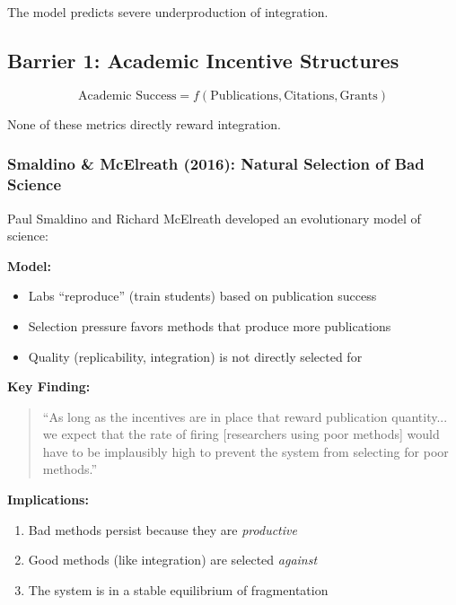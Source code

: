 \documentclass[12pt,a4paper]{article}
\begin{document}
The model predicts severe underproduction of integration.

\subsection{Barrier 1: Academic Incentive Structures}
\label{sec:barrier1}

\begin{equation}
\text{Academic Success} = f(\text{Publications}, \text{Citations}, \text{Grants})
\end{equation}

None of these metrics directly reward integration.

\subsubsection{Smaldino \& McElreath (2016): Natural Selection of Bad Science}

Paul Smaldino and Richard McElreath developed an evolutionary model of science:

\textbf{Model:}
\begin{itemize}
\item Labs ``reproduce'' (train students) based on publication success
\item Selection pressure favors methods that produce more publications
\item Quality (replicability, integration) is not directly selected for
\end{itemize}

\textbf{Key Finding:}
\begin{quote}
``As long as the incentives are in place that reward publication quantity... we expect that the rate of firing [researchers using poor methods] would have to be implausibly high to prevent the system from selecting for poor methods.''
\end{quote}

\textbf{Implications:}
\begin{enumerate}
\item Bad methods persist because they are \textit{productive}
\item Good methods (like integration) are selected \textit{against}
\item The system is in a stable equilibrium of fragmentation
\end{enumerate}
\end{document}
